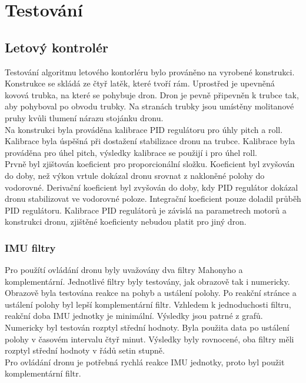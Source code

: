 \chapter{Testování}
\label{6-testovani}

\section{Letový kontrolér}
Testování algoritmu letového kontorléru bylo prováněno na vyrobené konstrukci. Konstrukce se skládá ze čtyř latěk, které tvoří rám. Uprostřed je upevněná kovová trubka, na které se pohybuje dron. Dron je pevně připevněn k trubce tak, aby pohyboval po obvodu trubky. Na stranách trubky jsou umístěny molitanové pruhy kvůli tlumení nárazu stojánku dronu.\\
Na konstrukci byla prováděna kalibrace PID regulátoru pro úhly pitch a roll. Kalibrace byla úspěšná při dostažení stabilizace dronu na trubce. Kalibrace byla prováděna pro úhel pitch, výsledky kalibrace se použijí i pro úhel roll.\\
Prvně byl zjištován koeficient pro proporcionální složku. Koeficient byl zvyšován do doby, než výkon vrtule dokázal dronu srovnat z nakloněné polohy do vodorovné. Derivační koeficient byl zvyšován do doby, kdy PID regulátor dokázal dronu stabilizovat ve vodorovné poloze. Integrační koeficient pouze doladil průběh PID regulátoru. Kalibrace PID regulátorů je závislá na parametrech motorů a konstrukci dronu, zjištěné koeficienty nebudou platit pro jiný dron.\\

\subsection{IMU filtry}
Pro použítí ovládání dronu byly uvažovány dva filtry Mahonyho a komplementární. Jednotlivé filtry byly testovány, jak obrazově tak i numericky.\\
Obrazově byla testována reakce na pohyb a ustálení polohy.
Po reakční stránce a ustálení  polohy byl lepší komplementární filtr. Vzhledem k jednoduchosti filtru, reakční doba IMU jednotky je minimální. Výsledky jsou patrné z grafů.\\
Numericky byl testován rozptyl střední hodnoty. Byla použita data po ustálení polohy v časovém intervalu čtyř minut. Výsledky byly rovnocené, oba filtry měli rozptyl střední hodnoty v řádů setin stupně.\\
Pro ovládání dronu je potřebná rychlá reakce IMU jednotky, proto byl použit komplementární filtr.\\

